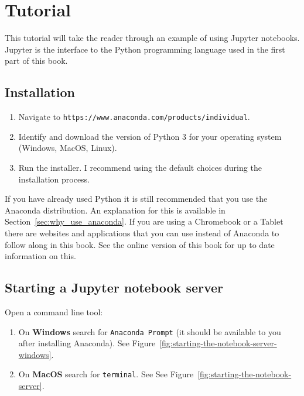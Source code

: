 \section{Tutorial}

This tutorial will take the reader through an example of using Jupyter
notebooks. Jupyter is the interface to the Python programming language used in the
first part of this book.

\subsection{Installation}
\begin{enumerate}
\item Navigate to \texttt{https://www.anaconda.com/products/individual}.

\item Identify and download the version of Python 3 for your operating system
(Windows, MacOS, Linux).

\item Run the installer. I recommend using the default choices during the
installation process.

\end{enumerate}

\begin{note}
If you have already used Python it is still recommended that you use the
Anaconda distribution. An explanation for this is available in
Section~\ref{sec:why_use_anaconda}. If you are using a Chromebook or a Tablet
there are websites and applications that you can use instead of Anaconda to
follow along in this book. See the online version of this book for up to
date information on this.
\end{note}


\subsection{Starting a Jupyter notebook server}
Open a command line tool:
\begin{enumerate}
\item 
On \textbf{Windows} search for \texttt{Anaconda Prompt} (it should be available to you
after installing Anaconda). See Figure~\ref{fig:starting-the-notebook-server-windows}.

\item On \textbf{MacOS} search for \texttt{terminal}. See
See Figure~\ref{fig:starting-the-notebook-server}.


\end{enumerate}

